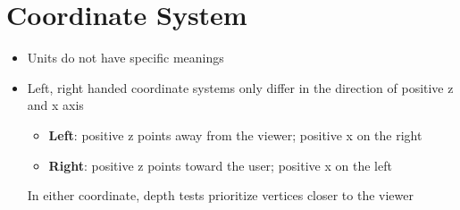 \section{Coordinate System}

\begin{itemize}
  \item Units do not have specific meanings
  \item Left, right handed coordinate systems only differ in the direction of
  positive z and x axis
  \begin{itemize}
    \item \textbf{Left}: positive z points away from the viewer; positive x on
    the right
    \item \textbf{Right}: positive z points toward the user; positive x on the
    left
  \end{itemize}

  In either coordinate, depth tests prioritize vertices closer to the viewer
\end{itemize}
